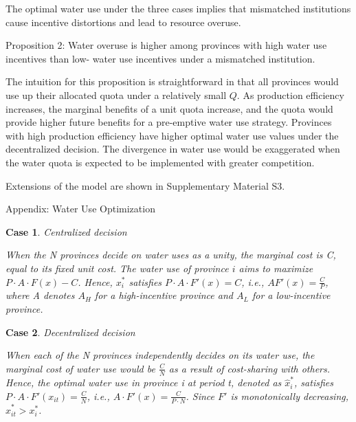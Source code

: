 \documentclass[default, sn-standardnature]{sn-jnl}
\newtheorem{case_appendix}{Case}
\begin{document}
The optimal water use under the three cases implies that mismatched institutions cause incentive distortions and lead to resource overuse.


Proposition 2: Water overuse is higher among provinces with high water use incentives than low- water use incentives under a mismatched institution.

The intuition for this proposition is straightforward in that all provinces would use up their allocated quota under a relatively small $Q$. As production efficiency increases, the marginal benefits of a unit quota increase, and the quota would provide higher future benefits for a pre-emptive water use strategy. Provinces with high production efficiency have higher optimal water use values under the decentralized decision. The divergence in water use would be exaggerated when the water quota is expected to be implemented with greater competition.


Extensions of the model are shown in Supplementary Material S3.%





Appendix: Water Use Optimization

\begin{case_appendix}Centralized decision

When the N provinces decide on water uses as a unity, the marginal cost is C, equal to its fixed unit cost.
The water use of province $i$ aims to maximize $P\cdot A\cdot F(x)-C$.
Hence, $x_i^*$ satisfies $P \cdot A\cdot F'(x)=C$, i.e., $AF'(x)=\frac{C}{P}$, where A denotes $A_H$ for a high-incentive province and $A_L$ for a low-incentive province.

\end{case_appendix}

 \begin{case_appendix}Decentralized decision

When each of the N provinces independently decides on its water use, the marginal cost of water use would be $\frac{C}{N}$ as a result of cost-sharing with others.
Hence, the optimal water use in province i at period t, denoted as $\hat x_i^*$, satisfies $P \cdot A \cdot F'(x_{it})=\frac{C}{N}$, i.e., $A \cdot F'(x)=\frac{C}{P \cdot N}$.
Since $F'$ is monotonically decreasing, $\hat x_{it}^*>x_i^*$.
\end{case_appendix}
\end{document}
